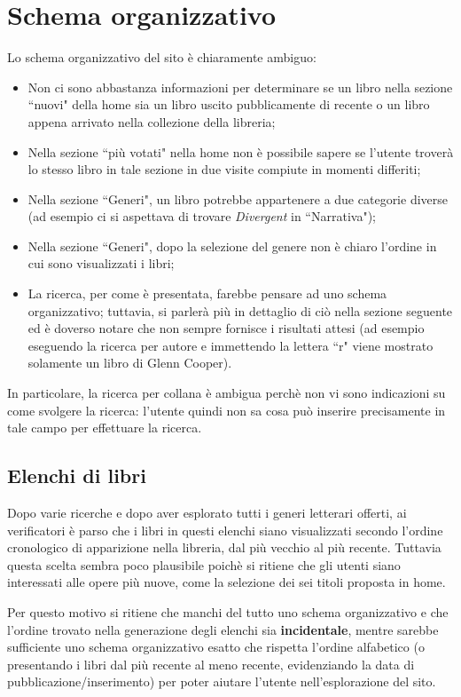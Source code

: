 \section{Schema organizzativo}\label{sec:schema-org}
Lo schema organizzativo del sito è chiaramente ambiguo:
\begin{itemize}
\item Non ci sono abbastanza informazioni per determinare se un libro nella
sezione ``nuovi" della home sia un libro uscito pubblicamente di recente o un
libro appena arrivato nella collezione della libreria;
\item Nella sezione ``più votati" nella home non è possibile sapere se
l'utente troverà lo stesso libro in tale sezione in due visite compiute in
momenti differiti;
\item Nella sezione ``Generi", un libro potrebbe appartenere a due categorie
diverse (ad esempio ci si aspettava di trovare \textit{Divergent} in
``Narrativa");
\item Nella sezione ``Generi", dopo la selezione del genere non è chiaro
l'ordine in cui sono visualizzati i libri;
\item La ricerca, per come è presentata, farebbe pensare ad uno schema
organizzativo; tuttavia, si parlerà più in dettaglio di ciò nella sezione
seguente ed è doverso notare che non sempre fornisce i risultati attesi (ad
esempio eseguendo la ricerca per autore e immettendo la lettera ``r" viene
mostrato solamente un libro di Glenn Cooper).
\end{itemize}

In particolare, la ricerca per collana è ambigua perchè non vi sono
indicazioni su come svolgere la ricerca: l'utente quindi non sa cosa può
inserire precisamente in tale campo per effettuare la ricerca.

\subsection{Elenchi di libri}\label{sec:schema-elenchi}
Dopo varie ricerche e dopo aver esplorato tutti i generi letterari offerti, ai
verificatori è parso che i libri in questi elenchi siano visualizzati secondo
l'ordine cronologico di apparizione nella libreria, dal più vecchio al
più recente. Tuttavia questa scelta sembra poco plausibile poichè si ritiene
che gli utenti siano interessati alle opere più nuove, come la selezione dei
sei titoli proposta in home.

Per questo motivo si ritiene che manchi del tutto uno schema organizzativo e
che l'ordine trovato nella generazione degli elenchi sia \textbf{incidentale},
mentre sarebbe sufficiente uno schema organizzativo esatto che rispetta
l'ordine alfabetico (o presentando i libri dal più recente al meno recente,
evidenziando la data di pubblicazione/inserimento) per poter aiutare l'utente
nell'esplorazione del sito.